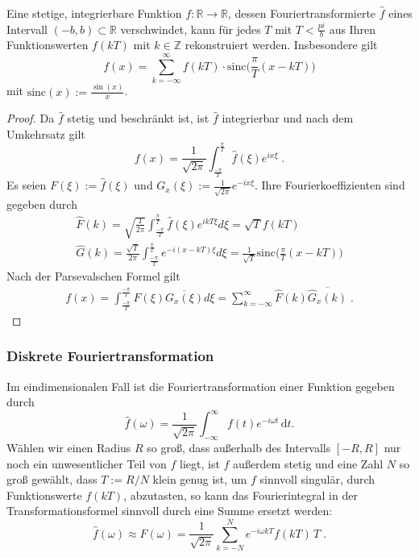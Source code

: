 \begin{Satz}
Eine stetige, integrierbare Funktion $f: \mathbb{R} \to \mathbb{R}$, dessen Fouriertransformierte $\hat{f}$ eines Intervall $(-b,b) \subset \mathbb{R}$ verschwindet, kann für jedes $T$ mit $T < \frac{pi}{b}$ aus Ihren Funktionswerten $f(kT)$ mit $k \in \mathbb{Z}$ rekonstruiert werden. Insbesondere gilt
$$ f(x) = \sum_{k= -\infty}^{\infty} f(kT) \cdot \text{sinc} \biggl (   \frac{\pi}{T}(x - k T) \biggr)$$  mit 
$ \text{sinc}(x):=  \frac{\sin(x)}{x}$.
\end{Satz}
\begin{proof}
Da $\hat{f}$ stetig und beschränkt ist, ist $\hat{f}$ integrierbar und nach dem Umkehrsatz gilt
$$ f(x) = \frac{1}{\sqrt{2 \pi}} \int_{\frac{- \pi}{T}}^{\frac{ \pi}{T}} \hat{f}(\xi) e^{ix \xi} \; .$$
Es seien $F(\xi):= \hat{f}(\xi)$ und $G_x(\xi):=\frac{1}{\sqrt{2 \pi}} e^{-ix \xi}$. Ihre Fourierkoeffizienten sind gegeben durch
\begin{align*}
\hat{F}(k) = \sqrt{\frac{T}{2 \pi}} \int_{\frac{- \pi}{T}}^{\frac{ \pi}{T}} \hat{f} (\xi) e^{ikT \xi}  d \xi = \sqrt{T} f(kT)  \\
\hat{G}(k) =  \frac{\sqrt{T}}{2 \pi} \int_{\frac{- \pi}{T}}^{\frac{ \pi}{T}}  e^{-i (x-kT) \xi}  d \xi = \frac{1}{\sqrt{T} }  \text{sinc} \biggl (   \frac{\pi}{T}(x - k T) \biggr)
\end{align*}
Nach der Parsevalschen Formel gilt
\begin{align*}
f(x) =  \int_{\frac{- \pi}{T}}^{\frac{- \pi}{T}} F(\xi) \overline{G_x(\xi)} d \xi =  \sum_{k= -\infty}^{\infty} \hat{F}(k) \overline {\hat{G}_x (k) } \; . 
\end{align*}
 
\end{proof}

\subsubsection{Diskrete Fouriertransformation}

Im eindimensionalen Fall ist die Fouriertransformation einer Funktion gegeben durch
$$
\hat f(\omega)= \frac{1}{\sqrt{2 \pi}} \int_{-\infty}^\infty f(t) e^{-i \omega t} \, \mathrm d t.
$$
Wählen wir einen Radius $R$ so groß, dass außerhalb des Intervalls $[-R,R]$ nur noch ein unwesentlicher Teil von $f$ liegt, ist $f$ außerdem stetig und eine Zahl $N$ so groß gewählt, dass $T:=R/N$ klein genug ist, um $f$ sinnvoll singulär,  durch Funktionswerte $f(kT)$, abzutasten, so kann das Fourierintegral in der Transformationsformel sinnvoll durch eine Summe ersetzt werden:
$$
\hat f(\omega)\approx F(\omega)=\frac{1}{\sqrt{2 \pi}} \sum_{k=-N}^N e^{-i \omega kT}f(kT) \,T \;.
$$

